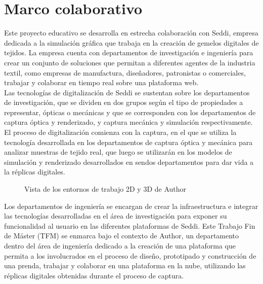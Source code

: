 \chapter{Marco colaborativo}



Este proyecto educativo se desarrolla en estrecha colaboraci\'on con Seddi, empresa dedicada a la simulaci\'on gr\'afica que
trabaja en la creaci\'on de gemelos digitales de tejidos. La empresa cuenta con departamentos de investigaci\'on e ingenier\'ia para
crear un conjunto de soluciones que permitan a diferentes agentes de la industria textil, como empresas de manufactura, dise\~nadores,
patronistas o comerciales, trabajar y colaborar en tiempo real sobre una plataforma web.\\

Las tecnolog\'ias de digitalizaci\'on de Seddi se sustentan sobre los departamentos de investigaci\'on, que se dividen en dos grupos
seg\'un el tipo de propiedades a representar, \'opticas o mec\'anicas y que se corresponden con los departamentos de captura
\'optica y renderizado, y captura mec\'anica y simulaci\'on respectivamente.
El proceso de digitalizaci\'on comienza con la captura, en el que se utiliza la tecnolog\'ia desarrollada en los departamentos de captura
\'optica y mec\'anica para analizar muestras de tejido real, que luego se utilizar\'an en los modelos de simulaci\'on y renderizado
desarrollados en sendos departamentos para dar vida a la r\'eplicas digitales. 

\begin{figure}[H]
    \vspace{0.5cm}
    \centering
    \caption[]{Vista de los entornos de trabajo 2D y 3D de Author}
\end{figure}
\newpage

Los departamentos de ingenier\'ia se encargan de crear la infraestructura e integrar las tecnolog\'ias desarrolladas en el \'area
de investigaci\'on para exponer su funcionalidad al usuario en las diferentes plataformas de Seddi.
Este Trabajo Fin de M\'aster (TFM) se enmarca bajo el contexto de Author, un departamento dentro del \'area de ingenier\'ia dedicado
a la creaci\'on de una plataforma que permita a los involucrados en el proceso de dise\~no, prototipado y construcci\'on de una prenda,
trabajar y colaborar en una plataforma en la nube, utilizando las r\'eplicas digitales obtenidas durante el proceso de captura.\\

